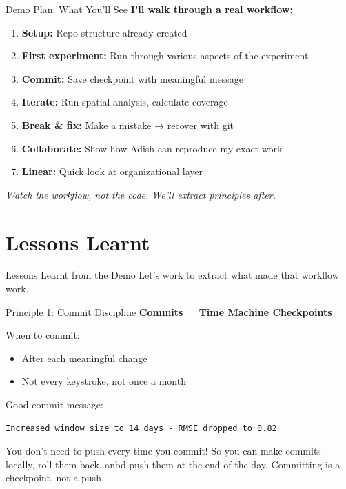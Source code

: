 \documentclass{beamer}
\begin{document}
\begin{frame}{Demo Plan: What You'll See}
    \textbf{I'll walk through a real workflow:}
    
    \vspace{0.5em}
    \begin{enumerate}
        \item \textbf{Setup:} Repo structure already created
        \item \textbf{First experiment:} Run through various aspects of the experiment
        \item \textbf{Commit:} Save checkpoint with meaningful message
        \item \textbf{Iterate:} Run spatial analysis, calculate coverage
        \item \textbf{Break \& fix:} Make a mistake → recover with git
        \item \textbf{Collaborate:} Show how Adish can reproduce my exact work
        \item \textbf{Linear:} Quick look at organizational layer
    \end{enumerate}
    
    \vspace{0.5em}
    \textit{Watch the workflow, not the code. We'll extract principles after.}
    \end{frame}

\section{Lessons Learnt}

\begin{frame}{Lessons Learnt from the Demo}
\Large
Let's work to extract what made that workflow work.
\end{frame}

\begin{frame}[fragile]{Principle 1: Commit Discipline}
\textbf{Commits = Time Machine Checkpoints}

\vspace{1em}
When to commit:
\begin{itemize}
    \item After each meaningful change
    \item Not every keystroke, not once a month
\end{itemize}

\vspace{1em}
Good commit message:
\begin{lstlisting}
Increased window size to 14 days - RMSE dropped to 0.82
\end{lstlisting}

\vspace{0.5em}
You don't need to push every time you commit! So you can make commits locally, roll them back, anbd push them at the end of the day. Committing is a checkpoint, not a push.
\end{frame}
\end{document}
